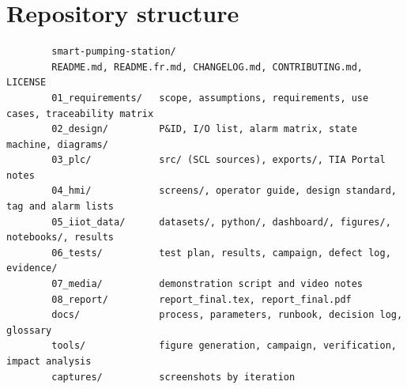 \documentclass[11pt,a4paper]{report}
\begin{document}
	\chapter{Repository structure}\label{app:tree}
	\begin{verbatim}
		smart-pumping-station/
		README.md, README.fr.md, CHANGELOG.md, CONTRIBUTING.md, LICENSE
		01_requirements/   scope, assumptions, requirements, use cases, traceability matrix
		02_design/         P&ID, I/O list, alarm matrix, state machine, diagrams/
		03_plc/            src/ (SCL sources), exports/, TIA Portal notes
		04_hmi/            screens/, operator guide, design standard, tag and alarm lists
		05_iiot_data/      datasets/, python/, dashboard/, figures/, notebooks/, results
		06_tests/          test plan, results, campaign, defect log, evidence/
		07_media/          demonstration script and video notes
		08_report/         report_final.tex, report_final.pdf
		docs/              process, parameters, runbook, decision log, glossary
		tools/             figure generation, campaign, verification, impact analysis
		captures/          screenshots by iteration
	\end{verbatim}
	
\end{document}

